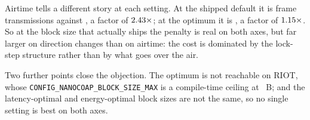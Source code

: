Airtime tells a different story at each setting. At the shipped default it is
\numFramesDefault{} frame transmissions against \numDtlsDatagramHi{}, a factor of
$2.43\times$; at the optimum it is \numBestFrames{}, a factor of
$1.15\times$. So at the block size that actually ships the penalty is real on both
axes, but far larger on direction changes than on airtime: the cost is dominated by the
lock-step structure rather than by what goes over the air.

Two further points close the objection. The optimum is not reachable on RIOT, whose
\texttt{CONFIG\_NANOCOAP\_BLOCK\_SIZE\_MAX} is a compile-time ceiling at \numCoapBlock~B; and
the latency-optimal and energy-optimal block sizes are not the same, so no single setting is
best on both axes.
